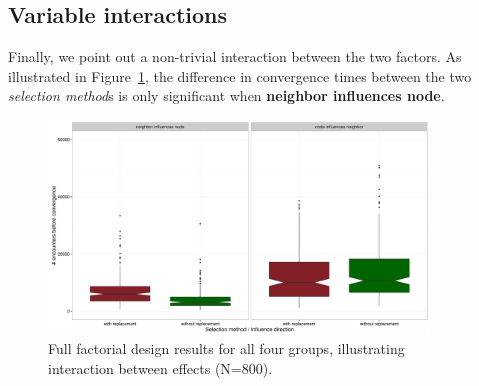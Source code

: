 \subsection{Variable interactions}

Finally, we point out a non-trivial interaction between the two factors. As
illustrated in Figure~\ref{interactionBoxplot}, the difference in convergence
times between the two \textsl{selection method}s is only significant when
\textbf{neighbor influences node}.

\begin{figure}[ht]
\centering
\includegraphics[width=0.9\textwidth]{interactionBoxplot.pdf} 
\caption{Full factorial design results for all four groups, illustrating
interaction between effects (N=800).}
\label{interactionBoxplot}
\end{figure}


